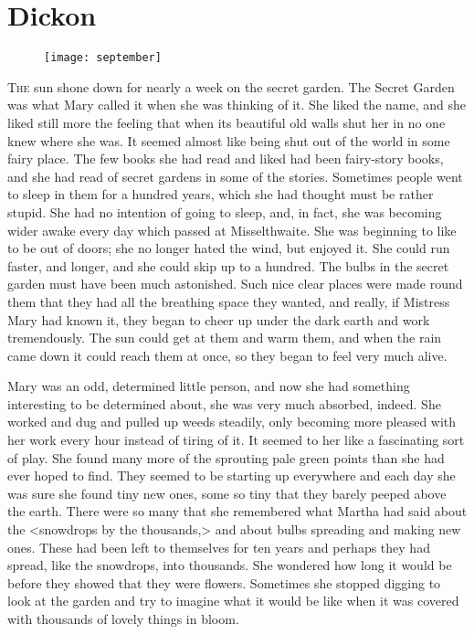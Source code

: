 \chapter{Dickon} 
\begin{figure}[t!]
\centering
\texttt{[image: september]}
\end{figure}

 \lettrine[]{T}{he} sun shone down for nearly a week on the secret garden. The Secret Garden was what Mary called it when she was thinking of it. She liked the name, and she liked still more the feeling that when its beautiful old walls shut her in no one knew where she was. It seemed almost like being shut out of the world in some fairy place. The few books she had read and liked had been fairy-story books, and she had read of secret gardens in some of the stories. Sometimes people went to sleep in them for a hundred years, which she had thought must be rather stupid. She had no intention of going to sleep, and, in fact, she was becoming wider awake every day which passed at Misselthwaite. She was beginning to like to be out of doors; she no longer hated the wind, but enjoyed it. She could run faster, and longer, and she could skip up to a hundred. The bulbs in the secret garden must have been much astonished. Such nice clear places were made round them that they had all the breathing space they wanted, and really, if Mistress Mary had known it, they began to cheer up under the dark earth and work tremendously. The sun could get at them and warm them, and when the rain came down it could reach them at once, so they began to feel very much alive.

Mary was an odd, determined little person, and now she had something interesting to be determined about, she was very much absorbed, indeed. She worked and dug and pulled up weeds steadily, only becoming more pleased with her work every hour instead of tiring of it. It seemed to her like a fascinating sort of play. She found many more of the sprouting pale green points than she had ever hoped to find. They seemed to be starting up everywhere and each day she was sure she found tiny new ones, some so tiny that they barely peeped above the earth. There were so many that she remembered what Martha had said about the <snowdrops by the thousands,> and about bulbs spreading and making new ones. These had been left to themselves for ten years and perhaps they had spread, like the snowdrops, into thousands. She wondered how long it would be before they showed that they were flowers. Sometimes she stopped digging to look at the garden and try to imagine what it would be like when it was covered with thousands of lovely things in bloom.

